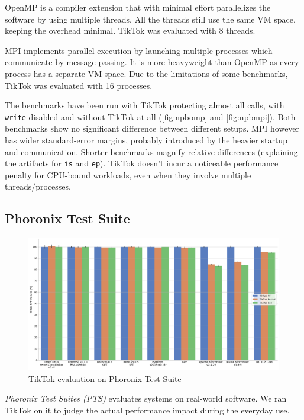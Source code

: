 \documentclass[conference]{IEEEtran}
\newcommand{\sysname}{TikTok}
\begin{document}
OpenMP is a compiler extension that with minimal effort parallelizes the software
by using multiple threads. All the threads still use the same VM space, keeping
the overhead minimal. \sysname{} was evaluated with 8 threads.

MPI implements parallel execution by launching multiple processes which communicate
by message-passing. It is more heavyweight than OpenMP as every process has a
separate VM space. Due to the limitations of some benchmarks, \sysname{} was 
evaluated with 16 processes.

The benchmarks have been run with \sysname{} protecting almost all calls, with
\texttt{write} disabled and without \sysname{} at all (\autoref{fig:npbomp} and
\autoref{fig:npbmpi}). Both benchmarks show no significant difference between
different setups. MPI however has wider standard-error margins, probably
introduced by the heavier startup and communication. Shorter benchmarks magnify
relative differences (explaining the artifacts for \texttt{is} and \texttt{ep}).
\sysname{} doesn't incur a noticeable performance
penalty for CPU-bound workloads, even when they involve multiple
threads/processes.

\subsection{Phoronix Test Suite}
\label{subsec:phoronix}

\begin{figure}[]
  \centering
  \includegraphics[width=\linewidth]{graphs/phoronix.png}
  \caption{\sysname{} evaluation on Phoronix Test Suite}
  \label{fig:phoronix}
\end{figure}

\emph{Phoronix Test Suites (PTS)} evaluates systems on real-world software. We
ran \sysname{} on it to judge the actual performance impact during the
everyday use.
\end{document}
